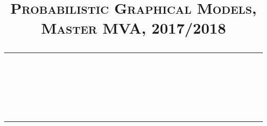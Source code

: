 \newcommand{\assignmenttitle}{}
\newcommand{\studentname}{}
\newcommand{\email}{}
\newcommand{\schoolyear}{2017/2018}


\title{
\normalfont \normalsize 
\textsc{Probabilistic Graphical Models, Master MVA, \schoolyear} \\
[10pt] 
\rule{\linewidth}{0.5pt} \\[6pt] 
\huge \assignmenttitle \\
\rule{\linewidth}{2pt}  \\[10pt]
}

\author{\studentname}

\date{\small\email}

\newcommand{\question}[1]{\subsubsection*{#1}}


\graphicspath{{images/}}

\newcommand{\labelnotempty}[1]{
\def\temp{#1}\ifx\temp\empty
\else
    \label{#1}
\fi
}
\newcommand{\singlefig}[4]{
\begin{figure}[ht!]
        \centering
        \texttt{[image: \#1]}
        \caption{#3}
        \labelnotempty{#4}
\end{figure}}

\newcommand{\subfig}[4]{
\texttt{[image: \#1]}
\caption{#3}
\labelnotempty{#4}
}

\newcommand{\doublefig}[4]{
\begin{figure}[ht!]
    \centering
    \begin{subfigure}[t]{0.45\columnwidth}
        \centering
    #1
    \end{subfigure}
    ~
    \begin{subfigure}[t]{0.45\columnwidth}
        \centering
    #2
    \end{subfigure}
    \caption{#3}
    \labelnotempty{#4}
\end{figure}}

\newcommand{\triplefig}[5]{
\begin{figure}[ht!]
    \centering
    \begin{subfigure}[t]{0.30\columnwidth}
        \centering
    #1
    \end{subfigure}
    ~
    \begin{subfigure}[t]{0.30\columnwidth}
        \centering
    #2
    \end{subfigure}
    ~
    \begin{subfigure}[t]{0.30\columnwidth}
        \centering
    #3
    \end{subfigure}
    \caption{#4}
    \labelnotempty{#5}
\end{figure}}

